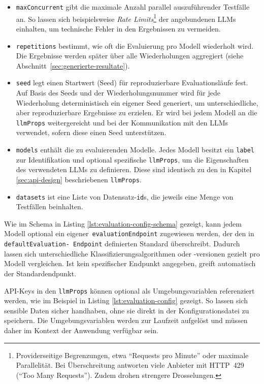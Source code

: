 \begin{itemize}
    \item \texttt{maxConcurrent} gibt die maximale Anzahl parallel auszuführender Testfälle an. So lassen sich beispielsweise \emph{Rate Limits}\footnote{Providerseitige Begrenzungen, etwa \enquote{Requests pro Minute} oder maximale Parallelität. Bei Überschreitung antworten viele Anbieter mit HTTP~429 (\enquote{Too Many Requests}). Zudem drohen strengere Drosselungen.} der angebundenen \acp{LLM} einhalten, um technische Fehler in den Ergebnissen zu vermeiden.
    \item \texttt{repetitions} bestimmt, wie oft die Evaluierung pro Modell wiederholt wird. Die Ergebnisse werden später über alle Wiederholungen aggregiert (siehe Abschnitt~\ref{sec:generierte-resultate}).
    \item \texttt{seed} legt einen Startwert (Seed) für reproduzierbare Evaluationsläufe fest. Auf Basis des Seeds und der Wiederholungsnummer wird für jede Wiederholung deterministisch ein eigener Seed generiert, um unterschiedliche, aber reproduzierbare Ergebnisse zu erzielen. Er wird bei jedem Modell an die \texttt{llmProps} weitergereicht und bei der Kommunikation mit den \acp{LLM} verwendet, sofern diese einen Seed unterstützen.
    \item \texttt{models} enthält die zu evaluierenden Modelle. Jedes Modell besitzt ein \texttt{label} zur Identifikation und optional spezifische \texttt{llmProps}, um die Eigenschaften des verwendeten \acp{LLM} zu definieren. Diese sind identisch zu den in Kapitel \ref{sec:api-design} beschriebenen \texttt{llmProps}.
    \item \texttt{datasets} ist eine Liste von Datensatz-\texttt{id}s, die jeweils eine Menge von Testfällen beinhalten.
\end{itemize}

Wie im Schema in Listing \ref{lst:evaluation-config-schema} gezeigt, kann jedem Modell optional ein eigener\linebreak~\texttt{evaluationEndpoint} zugewiesen werden, der den in \texttt{defaultEvaluation-\linebreak~Endpoint} definierten Standard überschreibt. Dadurch lassen sich unterschiedliche Klassifizierungsalgorithmen oder -versionen gezielt pro Modell vergleichen. Ist kein spezifischer Endpunkt angegeben, greift automatisch der Standardendpunkt.

API-Keys in den \texttt{llmProps} können optional als Umgebungsvariablen referenziert werden, wie im Beispiel in Listing \ref{lst:evaluation-config} gezeigt. So lassen sich sensible Daten sicher handhaben, ohne sie direkt in der Konfigurationsdatei zu speichern. Die Umgebungsvariablen werden zur Laufzeit aufgelöst und müssen daher im Kontext der Anwendung verfügbar sein.